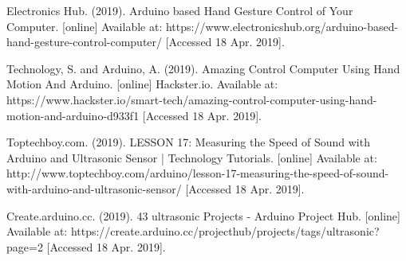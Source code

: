 \documentclass[12pt,journal]{IEEEtran}
\begin{document}
\begin{thebibliography}{1}

   Electronics Hub. (2019). Arduino based Hand Gesture Control of Your Computer. [online] Available at: https://www.electronicshub.org/arduino-based-hand-gesture-control-computer/ [Accessed 18 Apr. 2019].

    Technology, S. and Arduino, A. (2019). Amazing Control Computer Using Hand Motion And Arduino. [online] Hackster.io. Available at: https://www.hackster.io/smart-tech/amazing-control-computer-using-hand-motion-and-arduino-d933f1 [Accessed 18 Apr. 2019].

   Toptechboy.com. (2019). LESSON 17: Measuring the Speed of Sound with Arduino and Ultrasonic Sensor | Technology Tutorials. [online] Available at: http://www.toptechboy.com/arduino/lesson-17-measuring-the-speed-of-sound-with-arduino-and-ultrasonic-sensor/ [Accessed 18 Apr. 2019].

   Create.arduino.cc. (2019). 43 ultrasonic Projects - Arduino Project Hub. [online] Available at: https://create.arduino.cc/projecthub/projects/tags/ultrasonic?page=2 [Accessed 18 Apr. 2019].

  \end{thebibliography}



\end{document}
